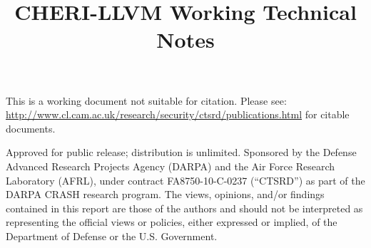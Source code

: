 \documentclass[10pt,a4paper]{book}
\title{CHERI-LLVM Working Technical Notes}
\begin{document}
\begin{minipage}[h]{\textwidth}
\maketitle

This is a working document not suitable for citation.  Please see:\\ \url{http://www.cl.cam.ac.uk/research/security/ctsrd/publications.html} for citable documents.

\vspace{2in}
{\footnotesize
Approved for public release; distribution is unlimited.
Sponsored by the Defense Advanced Research Projects Agency (DARPA) and the
Air Force Research Laboratory (AFRL), under contract FA8750-10-C-0237
(``CTSRD'') as part of the DARPA CRASH research program.
The views, opinions, and/or findings contained in this report are those of the
authors and should not be interpreted as representing the official views or
policies, either expressed or implied, of the Department of Defense or the
U.S. Government.
}
\end{minipage}
\normalsize
\clearpage







\printindex
\end{document}
